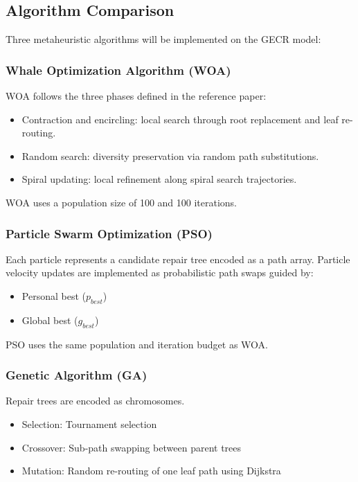 \documentclass[sigconf]{acmart}
\begin{document}
\subsection{Algorithm Comparison}

Three metaheuristic algorithms will be implemented on the GECR model:

\subsubsection{Whale Optimization Algorithm (WOA)}

WOA follows the three phases defined in the reference paper:

\begin{itemize}
    \item Contraction and encircling:
    local search through root replacement and leaf re-routing.
    
    \item Random search:
    diversity preservation via random path substitutions.
    
    \item Spiral updating:
    local refinement along spiral search trajectories.
\end{itemize}

WOA uses a population size of 100 and 100 iterations.

\subsubsection{Particle Swarm Optimization (PSO)}

Each particle represents a candidate repair tree encoded as a path
array. Particle velocity updates are implemented as probabilistic
path swaps guided by:

\begin{itemize}
    \item Personal best ($p_{best}$)
    \item Global best ($g_{best}$)
\end{itemize}

PSO uses the same population and iteration budget as WOA.

\subsubsection{Genetic Algorithm (GA)}

Repair trees are encoded as chromosomes.

\begin{itemize}
    \item Selection:
    Tournament selection
    
    \item Crossover:
    Sub-path swapping between parent trees
    
    \item Mutation:
    Random re-routing of one leaf path using Dijkstra
\end{itemize}
\end{document}
